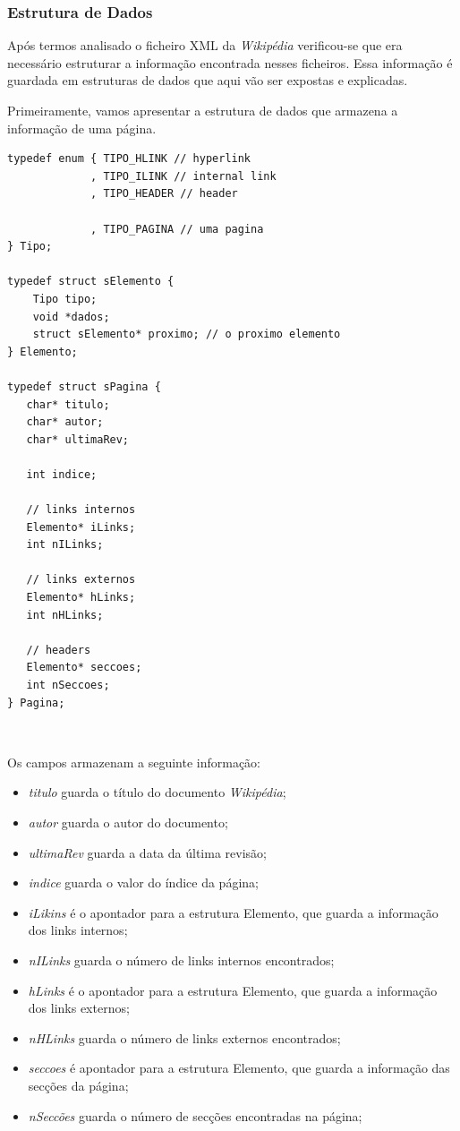 \documentclass[11pt, a4paper, oneside]{article}
\begin{document}
\subsubsection{Estrutura de Dados}

Após termos analisado o ficheiro XML da \textit{Wikipédia} verificou-se que era necessário estruturar a informação encontrada nesses ficheiros. Essa informação é guardada em estruturas de dados que aqui vão ser expostas e explicadas. 

Primeiramente, vamos apresentar a estrutura de dados que armazena a informação de uma página.
\begin{verbatim}
typedef enum { TIPO_HLINK // hyperlink
             , TIPO_ILINK // internal link
             , TIPO_HEADER // header

             , TIPO_PAGINA // uma pagina
} Tipo;

typedef struct sElemento {
    Tipo tipo;
    void *dados;
    struct sElemento* proximo; // o proximo elemento
} Elemento;

typedef struct sPagina {
   char* titulo;
   char* autor;
   char* ultimaRev;

   int indice;

   // links internos
   Elemento* iLinks;
   int nILinks;

   // links externos
   Elemento* hLinks;
   int nHLinks;
   
   // headers
   Elemento* seccoes;
   int nSeccoes;
} Pagina;

\end{verbatim}\


Os campos armazenam a seguinte informação:
\begin{itemize}

\item \textit{titulo} guarda o título do documento \textit{Wikipédia};
\item \textit{autor} guarda o autor do documento;
\item \textit{ultimaRev} guarda a data da última revisão;
\item \textit{indice} guarda o valor do índice da página;
\item \textit{iLikins} é o apontador para a estrutura Elemento, que guarda a informação dos links internos;
\item \textit{nILinks} guarda o número de links internos encontrados;
\item \textit{hLinks} é o apontador para a estrutura Elemento, que guarda a informação dos links externos;
\item \textit{nHLinks} guarda o número de links externos encontrados;
\item \textit{seccoes} é apontador para a estrutura Elemento, que guarda a informação das secções da página;
\item \textit{nSeccões} guarda o número de secções encontradas na página;

\end{itemize}
\end{document}
